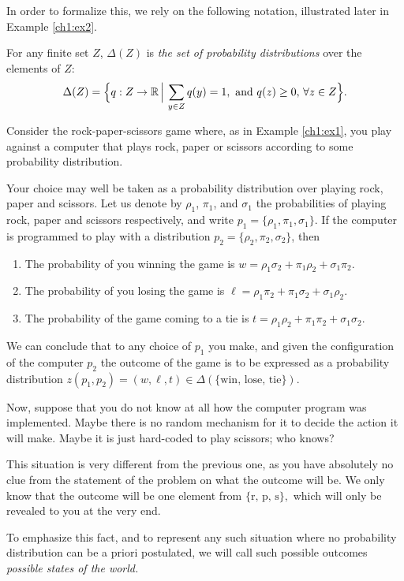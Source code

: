 In order to formalize this, we rely on the following notation, illustrated later in Example \ref{ch1:ex2}.
\begin{notation}[$\Delta$]
For any finite set $Z$, $\Delta(Z)$ is \emph{the set of probability distributions} over the elements of $Z$:
$$ \Delta(Z) = \Big \{q : Z \rightarrow \mathbb{R} \, \Big | \, \sum_{y \in Z} q(y) = 1,
\text{ and }  q(z) \geq 0 ,\, \forall z \in Z \Big \}.$$
\end{notation}

\begin{example}
\label{ch1:ex2}

Consider the rock-paper-scissors game where, as in Example \ref{ch1:ex1}, you play against a computer that plays rock, paper or scissors according to some probability distribution.

Your choice may well be taken as a probability distribution over playing rock, paper and scissors.
Let us denote by $\rho_1$, $\pi_1$, and $\sigma_1$ the probabilities of playing rock, paper and scissors respectively, and write $p_1 = \{\rho_1, \pi_1, \sigma_1\}$.
If the computer is programmed to play with a distribution
$p_2 = \{\rho_2,  \pi_2, \sigma_2\}$, then
\begin{enumerate}
\item The probability of you winning the game is
$w = \rho_1 \sigma_2 + \pi_1 \rho_2 + \sigma_1 \pi_2.$
\item The probability of you losing the game is
$\ell = \rho_1 \pi_2 + \pi_1 \sigma_2 + \sigma_1 \rho_2.$
\item The probability of the game coming to a tie is
$t = \rho_1 \rho_2 + \pi_1 \pi_2 + \sigma_1 \sigma_2.$
\end{enumerate}
We can conclude that to any choice of $p_1$ you make, and given the configuration of the computer $p_2$ the outcome of the game is to be expressed as a probability distribution $z(p_1, p_2) = (w, \ell, t) \in \Delta(\{\text{win, lose, tie}\})$.

Now, suppose that you do not know at all how the computer program was implemented.
Maybe there is no random mechanism for it to decide the action it will make.
  Maybe it is just hard-coded to play scissors; who knows?

This situation is very different from the previous one, as you have absolutely no clue from the statement of the problem on what the outcome will be.
We only know that the outcome will be one element from $\{\mbox{r, p, s}\},$ which will only be revealed to you at the very end.

To emphasize this fact, and to represent any such situation where no probability distribution can be a priori postulated,
  we will call such possible outcomes \emph{possible states of the world.}
\end{example}



